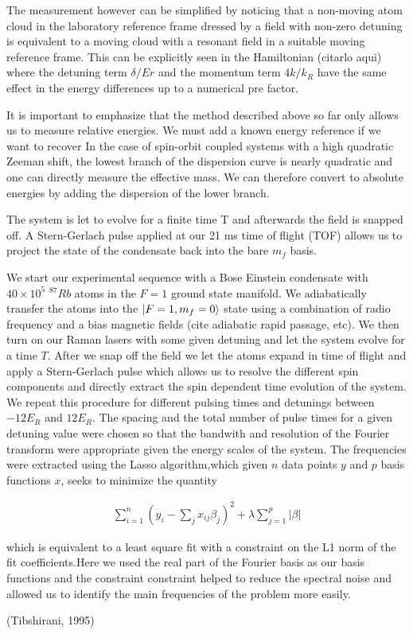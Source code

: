 The measurement however can be simplified by noticing that a non-moving atom cloud in the laboratory reference frame dressed by a field with non-zero detuning is equivalent to a moving cloud with a resonant field in a suitable moving reference frame. This can be explicitly seen in the Hamiltonian (citarlo aqui) where the detuning term $\delta/Er$  and the momentum term $4 k/k_R$ have the same effect in the energy differences up to a numerical pre factor.

It is important to emphasize that the method described above so far only allows us to measure relative energies. We must add a known energy reference if we want to recover In the case of spin-orbit coupled systems with a high quadratic Zeeman shift, the lowest branch of the dispersion curve is nearly quadratic and one can directly measure the effective mass.  We can therefore convert to absolute energies by adding the dispersion of the lower branch.


The system is let to evolve for a finite time T and afterwards the field is snapped off. A Stern-Gerlach pulse applied at our 21 ms time of flight (TOF) allows us to project the state of the condensate back into the bare $m_f$ basis. 


We start our experimental sequence with a Bose Einstein condensate with $40\times 10^5$ $^{87}Rb$ atoms in the $F=1$ ground state manifold. We adiabatically transfer the atoms into the $|F=1,m_f=0\rangle$ state using a combination of radio frequency and a bias magnetic fields (cite adiabatic rapid passage, etc). We then turn on our Raman lasers with some given detuning and let the system evolve for a time $T$. After we snap off the field we let the atoms expand in time of flight and apply a Stern-Gerlach pulse which allows us to resolve the different spin components and directly extract the spin dependent time evolution of the system. We repeat this procedure for different pulsing times and detunings between $-12 E_R$ and $12 E_R$. The spacing and the total number of pulse times for a given detuning value were chosen so that the bandwith and resolution of the Fourier transform were appropriate given the energy scales of the system. The frequencies were extracted using the Lasso algorithm,which given $n$ data points $y$ and $p$ basis functions $x$, seeks to minimize the quantity

\begin{align}
	\sum_{i=1}^{n}(y_i-\sum_{j}x_{ij}\beta_j)^2+\lambda\sum_{j=1}^{p}\lvert\beta\rvert
\end{align}

which is equivalent to a least square fit with a constraint on the L1 norm of the fit coefficients.Here we used the real part of the Fourier basis as our basis functions and the constraint constraint helped to reduce the spectral noise and allowed us to identify the main frequencies of the problem more easily.


(Tibshirani, 1995)

